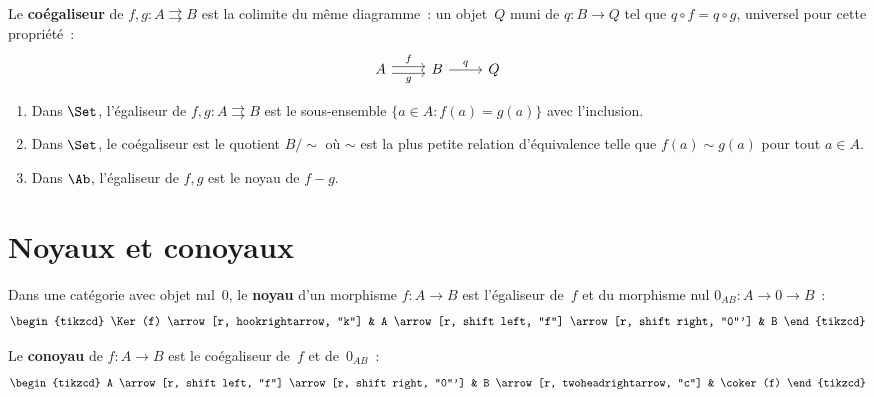 \begin{definition}[Coégaliseur]\label{def:coegaliseur}
Le \textbf{coégaliseur} de $f,g\colon A\rightrightarrows B$ est la colimite
du même diagramme~: un objet~$Q$ muni de $q\colon B\to Q$
tel que $q\circ f = q\circ g$, universel pour cette propriété~:
\[
\begin{tikzcd}
A \arrow[r, shift left, "f"] \arrow[r, shift right, "g"'] & B \arrow[r, "q"] & Q
\end{tikzcd}
\]
\end{definition}

\begin{exemple}\label{ex:egaliseurs-concrets}
\begin{enumerate}[label=(\roman*)]
\item Dans $\Set$, l'égaliseur de $f,g\colon A\rightrightarrows B$ est
      le sous-ensemble $\{a\in A : f(a)=g(a)\}$ avec l'inclusion.
\item Dans $\Set$, le coégaliseur est le quotient $B/{\sim}$ où $\sim$
      est la plus petite relation d'équivalence telle que $f(a)\sim g(a)$
      pour tout $a\in A$.
\item Dans $\Ab$, l'égaliseur de $f,g$ est le noyau de $f-g$.
\end{enumerate}
\end{exemple}


\section{Noyaux et conoyaux}\label{sec:noyaux-conoyaux}

\begin{definition}[Noyau]\label{def:noyau}
Dans une catégorie avec objet nul~$0$, le \textbf{noyau}
d'un morphisme $f\colon A\to B$ est l'égaliseur de~$f$ et du morphisme
nul $0_{AB}\colon A\to 0\to B$~:
\[
\begin{tikzcd}
\Ker(f) \arrow[r, hookrightarrow, "k"] & A \arrow[r, shift left, "f"] \arrow[r, shift right, "0"'] & B
\end{tikzcd}
\]
\end{definition}

\begin{definition}[Conoyau]\label{def:conoyau}
Le \textbf{conoyau} de $f\colon A\to B$ est le coégaliseur de~$f$ et de~$0_{AB}$~:
\[
\begin{tikzcd}
A \arrow[r, shift left, "f"] \arrow[r, shift right, "0"'] & B \arrow[r, twoheadrightarrow, "c"] & \coker(f)
\end{tikzcd}
\]
\end{definition}

